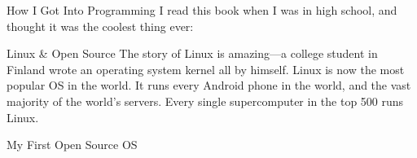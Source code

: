 \documentclass[14pt]{beamer}
\begin{document}
\begin{frame}{How I Got Into Programming}
  I read this book when I was in high school, and thought it was the coolest
  thing ever:
  \newline
  \newline
\end{frame}

\begin{frame}{Linux \& Open Source}
  The story of Linux is amazing---a college student in Finland wrote an
  operating system kernel all by himself.
  \newline
  \newline
  Linux is now the most popular OS in the world. It runs every Android phone in
  the world, and the vast majority of the world's servers. Every single
  supercomputer in the top 500 runs Linux.
\end{frame}

\begin{frame}{My First Open Source OS}
\end{frame}
\end{document}
